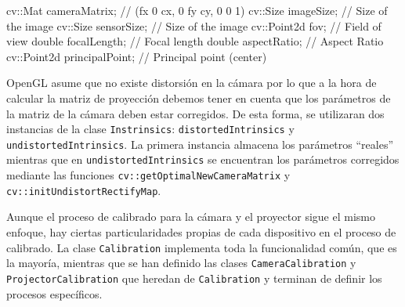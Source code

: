 \begin{listing}[
  float=ht,
  language = C++,
  caption  = {Atributos de la clase Intrinsics},
  label    = code:Intrinsics]
 cv::Mat cameraMatrix;       // (fx 0 cx, 0 fy cy, 0 0 1)
 cv::Size imageSize;         // Size of the image
 cv::Size sensorSize;        // Size of the image
 cv::Point2d fov;            // Field of view
 double focalLength;         // Focal length
 double aspectRatio;         // Aspect Ratio
 cv::Point2d principalPoint; // Principal point (center)
\end{listing}

OpenGL asume que no existe distorsión en la cámara por lo que a la hora de calcular la matriz de proyección debemos tener en cuenta que los parámetros de la matriz de la cámara deben estar corregidos. De esta forma, se utilizaran dos instancias de la clase \texttt{Instrinsics}: \texttt{distortedIntrinsics} y \texttt{undistortedIntrinsics}. La primera instancia almacena los parámetros ``reales'' mientras que en \texttt{undistortedIntrinsics} se encuentran los parámetros corregidos mediante las funciones \texttt{cv::getOptimalNewCameraMatrix} y \texttt{cv::initUndistortRectifyMap}.

%  
%
% 

Aunque el proceso de calibrado para la cámara y el proyector sigue el mismo enfoque, hay ciertas particularidades propias de cada dispositivo en el proceso de calibrado. La clase \texttt{Calibration} implementa toda la funcionalidad común, que es la mayoría, mientras que se han definido las clases \texttt{CameraCalibration} y \texttt{ProjectorCalibration} que heredan de \texttt{Calibration} y terminan de definir los procesos específicos.

